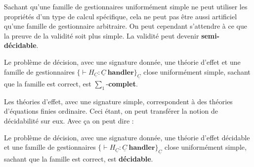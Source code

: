 Sachant qu'une famille de gestionnaires uniformément simple ne peut utiliser les propriétés d'un type de calcul spécifique, cela ne peut pas être aussi artificiel qu'une famille de gestionnaire arbitraire. On peut cependant s'attendre à ce que la preuve de la validité soit plus simple. La validité peut devenir \textbf{semi-décidable}.

\begin{theorem}
	Le problème de décision, avec une signature donnée, une théorie d'effet et une famille de gestionnaires $\{\vdash H_{\underline{C}}:\underline{C}~\textbf{handler}\}_{\underline{C}}$ close uniformément simple, sachant que la famille est correct, est $\sum_1$-\textbf{complet}.
\end{theorem}

Les théories d'effet, avec une signature simple, correspondent à des théories d'équations finies ordinaire. Ceci étant, on peut transférer la notion de décidabilité sur eux. Avec ça on peut dire :

\begin{theorem}
	Le problème de décision, avec une signature donnée, une théorie d'effet décidable et une famille de gestionnaires $\{\vdash H_{\underline{C}}:\underline{C}~\textbf{handler}\}_{\underline{C}}$ close uniformément simple, sachant que la famille est correct, est \textbf{décidable}.
\end{theorem}